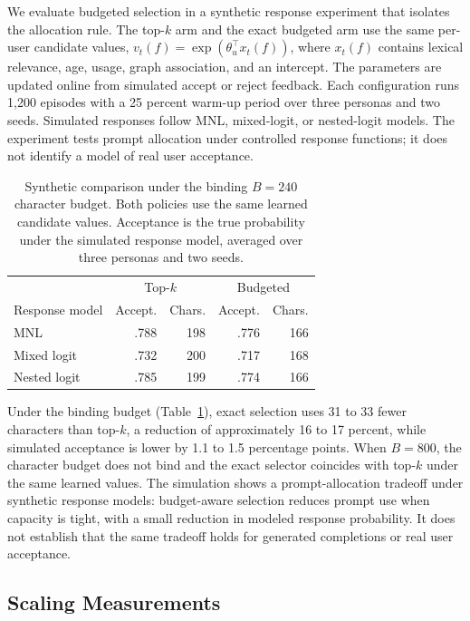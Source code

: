 \documentclass[letterpaper]{article} %
\begin{document}
We evaluate budgeted selection in a synthetic response experiment that isolates the allocation rule. The top-$k$ arm and the exact budgeted arm use the same per-user candidate values, $v_t(f)=\exp(\theta_u^{\top}x_t(f))$, where $x_t(f)$ contains lexical relevance, age, usage, graph association, and an intercept. The parameters are updated online from simulated accept or reject feedback. Each configuration runs 1{,}200 episodes with a 25 percent warm-up period over three personas and two seeds. Simulated responses follow MNL, mixed-logit, or nested-logit models. The experiment tests prompt allocation under controlled response functions; it does not identify a model of real user acceptance.

\begin{table}[t]
\centering
\small
\begin{tabular}{@{}lrrrr@{}}
\toprule
& \multicolumn{2}{c}{Top-$k$} & \multicolumn{2}{c}{Budgeted} \\
Response model & Accept. & Chars. & Accept. & Chars. \\
\midrule
MNL & .788 & 198 & .776 & 166 \\
Mixed logit & .732 & 200 & .717 & 168 \\
Nested logit & .785 & 199 & .774 & 166 \\
\bottomrule
\end{tabular}
\caption{Synthetic comparison under the binding $B=240$ character budget. Both policies use the same learned candidate values. Acceptance is the true probability under the simulated response model, averaged over three personas and two seeds.}
\label{tab:budgeted_selection_sim}
\end{table}

Under the binding budget (Table~\ref{tab:budgeted_selection_sim}), exact selection uses 31 to 33 fewer characters than top-$k$, a reduction of approximately 16 to 17 percent, while simulated acceptance is lower by 1.1 to 1.5 percentage points. When $B=800$, the character budget does not bind and the exact selector coincides with top-$k$ under the same learned values. The simulation shows a prompt-allocation tradeoff under synthetic response models: budget-aware selection reduces prompt use when capacity is tight, with a small reduction in modeled response probability. It does not establish that the same tradeoff holds for generated completions or real user acceptance.

\subsection{Scaling Measurements}
\end{document}
